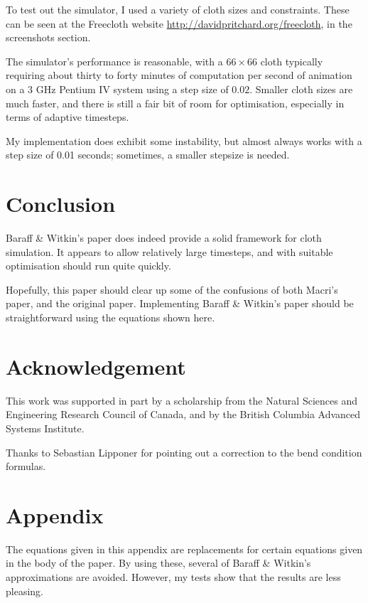 \documentclass[twocolumn]{article}
\begin{document}
To test out the simulator, I used a variety of cloth sizes and constraints.
These can be seen at the Freecloth website
\url{http://davidpritchard.org/freecloth},
in the screenshots section.

The simulator's performance is reasonable, with a $66\times66$ cloth typically
requiring about thirty to forty minutes of computation per second of animation
on a 3 GHz Pentium IV system using a step size of $0.02$. Smaller cloth sizes
are much faster, and there is still a fair bit of room for optimisation,
especially in terms of adaptive timesteps.

My implementation does exhibit some instability, but almost always works with
a step size of 0.01 seconds; sometimes, a smaller stepsize is needed.

\section{Conclusion}

Baraff \& Witkin's paper does indeed provide a solid framework for cloth
simulation. It appears to allow relatively large timesteps, and with suitable
optimisation should run quite quickly.

Hopefully, this paper should clear up some of the confusions of both Macri's
paper, and the original paper.
Implementing Baraff \& Witkin's paper should be straightforward using the
equations shown here.

\section{Acknowledgement}

This work was supported in part by a scholarship from the Natural Sciences
and Engineering Research Council of Canada, and by the British Columbia
Advanced Systems Institute.

Thanks to Sebastian Lipponer for pointing out a correction to the bend
condition formulas.




\clearpage

\appendix
{}
\section{Appendix}

The equations given in this appendix are replacements for certain equations
given in the body of the paper. By using these, several of Baraff \& Witkin's
approximations are avoided. However, my tests show that the results are
less pleasing.
\end{document}
